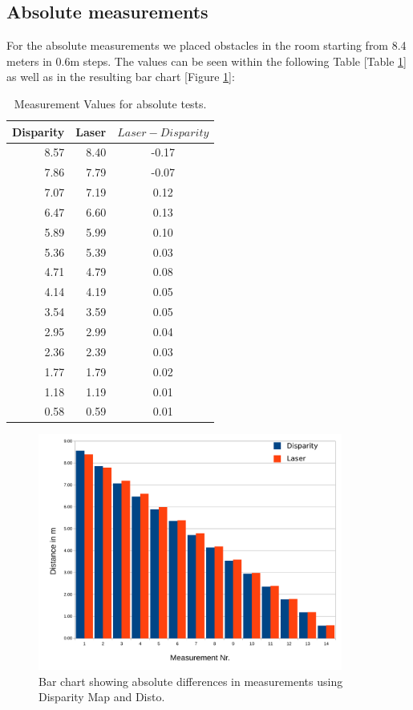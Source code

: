 \documentclass[11pt]{article}
\begin{document}
\pagebreak

\subsection{Absolute measurements}
For the absolute measurements we placed obstacles in the room starting from 8.4 meters in 0.6m steps. The values can be seen within the following Table [Table \ref{table:absolute-table}] as well as in the resulting bar chart [Figure \ref{fig:absolute-chart}]:

\begin{table}[htbp]
	\begin{center}
	\begin{tabular}{|r|r|c|}
	\hline
	\multicolumn{1}{|l|}{Disparity} & \multicolumn{1}{l|}{Laser} & \multicolumn{1}{l|}{$Laser - Disparity$} \\ \hline
	8.57 & 8.40 & -0.17 \\ \hline
	7.86 & 7.79 & -0.07 \\ \hline
	7.07 & 7.19 & 0.12 \\ \hline
	6.47 & 6.60 & 0.13 \\ \hline
	5.89 & 5.99 & 0.10 \\ \hline
	5.36 & 5.39 & 0.03 \\ \hline
	4.71 & 4.79 & 0.08 \\ \hline
	4.14 & 4.19 & 0.05 \\ \hline
	3.54 & 3.59 & 0.05 \\ \hline
	2.95 & 2.99 & 0.04 \\ \hline
	2.36 & 2.39 & 0.03 \\ \hline
	1.77 & 1.79 & 0.02 \\ \hline
	1.18 & 1.19 & 0.01 \\ \hline
	0.58 & 0.59 & 0.01 \\ \hline
	\end{tabular}
	\end{center}
	\caption{Measurement Values for absolute tests.}
	\label{table:absolute-table}
\end{table}

\begin{figure}[H]
        \centering
        \includegraphics[width=10cm]{images/absolute-measurements.pdf}
       	\caption{Bar chart showing absolute differences in measurements using Disparity Map and Disto.}
        \label{fig:absolute-chart}
\end{figure}
\end{document}
